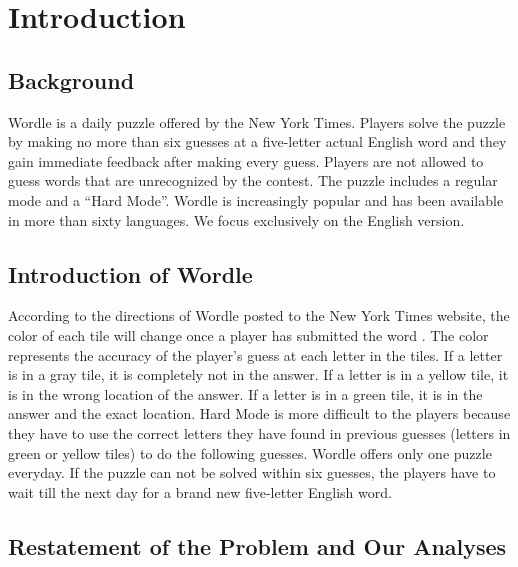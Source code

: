 \documentclass{mcmthesis}
\renewcommand{\contentsname}{\hspace*{\fill}\Large\bfseries Contents \hspace*{\fill}}
\begin{document}
\maketitle

\tableofcontents   %
\thispagestyle{empty}

\newpage


\section{Introduction}

\subsection{Background}

Wordle is a daily puzzle offered by the New York Times. Players solve the puzzle by making no more than six guesses at a five-letter actual English word and they gain immediate feedback after making every guess. Players are not allowed to guess words that are unrecognized by the contest. The puzzle includes a regular mode and a “Hard Mode”. Wordle is increasingly popular and has been available in more than sixty languages. We focus exclusively on the English version.

\subsection{Introduction of Wordle}

According to the directions of Wordle posted to the New York Times website, the color of each tile will change once a player has submitted the word \cite{1}. The color represents the accuracy of the player’s guess at each letter in the tiles. If a letter is in a gray tile, it is completely not in the answer. If a letter is in a yellow tile, it is in the wrong location of the answer. If a letter is in a green tile, it is in the answer and the exact location. Hard Mode is more difficult to the players because they have to use the correct letters they have found in previous guesses (letters in green or yellow tiles) to do the following guesses. Wordle offers only one puzzle everyday. If the puzzle can not be solved within six guesses, the players have to wait till the next day for a brand new five-letter English word.

\subsection{Restatement of the Problem and Our Analyses}
\end{document}
